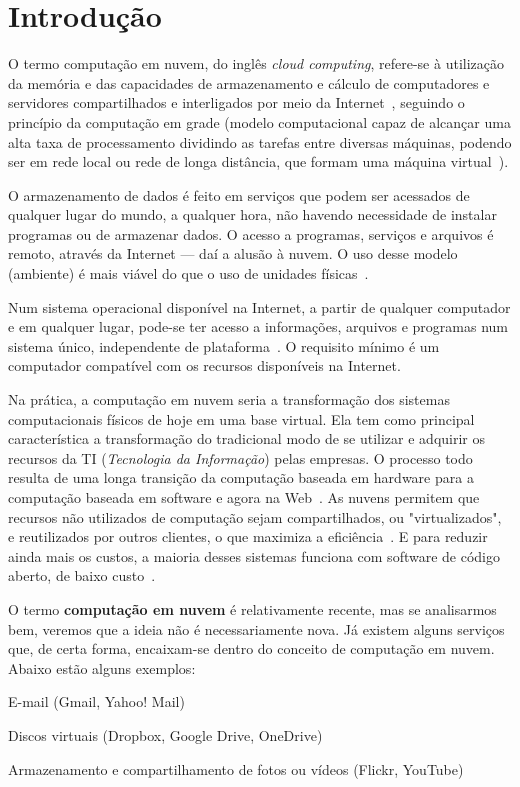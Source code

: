 \section{Introdução}

O termo computação em nuvem, do inglês \emph{cloud computing}, refere-se à 
utilização da memória e das capacidades de armazenamento e cálculo de computadores e 
servidores compartilhados e interligados por meio da 
Internet~\cite{aun-usp-dropbox-cloud-computing}, seguindo o princípio da computação 
em grade (modelo computacional capaz de alcançar uma alta taxa de processamento 
dividindo as tarefas entre diversas máquinas, podendo ser em rede local ou rede de 
longa distância, que formam uma máquina virtual~\cite{ibm-redbooks-grid-computing}).

O armazenamento de dados é feito em serviços que podem ser acessados de qualquer 
lugar do mundo, a qualquer hora, não havendo necessidade de instalar programas ou de 
armazenar dados. O acesso a programas, serviços e arquivos é remoto, através da 
Internet --- daí a alusão à nuvem. O uso desse modelo (ambiente) é mais viável do 
que o uso de unidades físicas~\cite{aun-usp-dropbox-cloud-computing}.

Num sistema operacional disponível na Internet, a partir de qualquer computador e em 
qualquer lugar, pode-se ter acesso a informações, arquivos e programas num sistema 
único, independente de plataforma~\cite{aun-usp-dropbox-cloud-computing}. O 
requisito mínimo é um computador compatível com os recursos disponíveis na Internet.

Na prática, a computação em nuvem seria a transformação dos sistemas computacionais 
físicos de hoje em uma base virtual. Ela tem como principal característica a 
transformação do tradicional modo de se utilizar e adquirir os recursos da TI 
(\emph{Tecnologia da Informação}) pelas empresas. O processo todo resulta de uma 
longa transição da computação baseada em hardware para a computação baseada em 
software e agora na Web~\cite{reuters-industry-hope-clouds}. As nuvens permitem que 
recursos não utilizados de computação sejam compartilhados, ou "virtualizados", e 
reutilizados por outros clientes, o que maximiza a 
eficiência~\cite{reuters-industry-hope-clouds}. E para reduzir ainda mais os custos, 
a maioria desses sistemas funciona com software de código aberto, de baixo 
custo~\cite{reuters-industry-hope-clouds}.

O termo \textbf{computação em nuvem} é relativamente recente, mas se analisarmos bem,
veremos que a ideia não é necessariamente nova. Já existem alguns serviços que,
de certa forma, encaixam-se dentro do conceito de computação em nuvem. Abaixo estão
alguns exemplos:

\begin{itemise}
    \item E-mail (Gmail, Yahoo! Mail)

    \item Discos virtuais (Dropbox, Google Drive, OneDrive)

    \item Armazenamento e compartilhamento de fotos ou vídeos (Flickr, YouTube)
\end{itemise}
